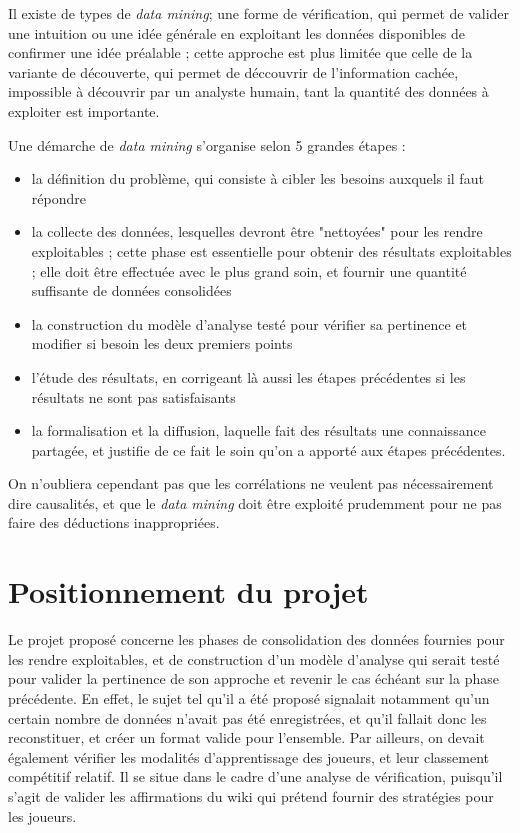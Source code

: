 Il existe de types de \textit{data mining}; une forme de vérification, qui permet de valider une intuition ou une idée générale en exploitant les données disponibles de confirmer une idée préalable ; cette approche est plus limitée que celle de la variante de découverte, qui permet de déccouvrir de l'information cachée, impossible à découvrir par un analyste humain, tant la quantité des données à exploiter est importante. 

Une démarche de \textit{data mining} s'organise selon 5 grandes étapes : 
\begin{itemize}
\item la définition du problème, qui consiste à cibler les besoins auxquels il faut répondre
\item la collecte des données, lesquelles devront être "nettoyées" pour les rendre exploitables ; cette phase est essentielle pour obtenir des résultats exploitables ; elle doit être effectuée avec le plus grand soin, et fournir une quantité suffisante de données consolidées
\item la construction du modèle d'analyse testé pour vérifier sa pertinence et modifier si besoin les deux premiers points
\item l'étude des résultats, en corrigeant là aussi les étapes précédentes si les résultats ne sont pas satisfaisants
\item la formalisation et la diffusion, laquelle fait des résultats une connaissance partagée, et justifie de ce fait le soin qu'on a apporté aux étapes précédentes. 

\end{itemize}

On n'oubliera cependant pas que les corrélations ne veulent pas nécessairement dire causalités, et que le \textit{data mining} doit être exploité prudemment pour ne pas faire des déductions inappropriées. 



\section{Positionnement du projet}
Le projet proposé concerne les phases de consolidation des données fournies pour les rendre exploitables, et de construction d'un modèle d'analyse qui serait testé pour valider la pertinence de son approche et revenir le cas échéant sur la phase précédente. 
En effet, le sujet tel qu'il a été proposé signalait notamment qu'un certain nombre de données n'avait pas été enregistrées, et qu'il fallait donc les reconstituer, et créer un format valide pour l'ensemble. Par ailleurs, on devait également vérifier les modalités d'apprentissage des joueurs, et leur classement compétitif relatif. 
Il se situe dans le cadre d'une analyse de vérification, puisqu'il s'agit de valider les affirmations du wiki qui prétend fournir des stratégies pour les joueurs. 











